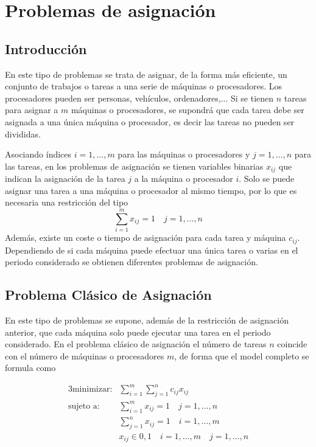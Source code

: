 \section{Problemas de asignación}

\subsection{Introducción}

En este tipo de problemas se trata de asignar, de la forma más eficiente, un conjunto de trabajos o tareas a una serie de 
máquinas o procesadores. Los procesadores pueden ser personas, vehículos, ordenadores,... Si se tienen $n$ tareas para asignar
a $m$ máquinas o procesadores, se supondrá que cada tarea debe ser asignada a una única máquina o procesador, es decir las 
tareas no pueden ser divididas.

\vspace*{2mm}

Asociando índices $i=1,\dots,m$ para las máquinas o procesadores y $j=1,\dots,n$ para las tareas, en los problemas de 
asignación se tienen variables binarias $x_{ij}$ que indican la asignación de la tarea $j$ a la máquina o procesador $i$.
Solo se puede asignar una tarea a una máquina o procesador al mismo tiempo, por lo que es necesaria una restricción del tipo
\[
    \sum_{i=1}^m x_{ij}=1 \quad j=1,\dots,n
\]
Además, existe un coste o tiempo de asignación para cada tarea y máquina $c_{ij}$. Dependiendo de si cada máquina puede
efectuar una única tarea o varias en el periodo considerado se obtienen diferentes problemas de asignación.

\subsection{Problema Clásico de Asignación}

En este tipo de problemas se supone, además de la restricción de asignación anterior, que cada máquina solo puede ejecutar 
una tarea en el periodo considerado. En el problema clásico de asignación el número de tareas $n$ coincide con el número de
máquinas o procesadores $m$, de forma que el model completo se formula como

\begin{alignat}{3}
    \text{minimizar:}   &   \sum_{i=1}^m\sum_{j=1}^n c_{ij}x_{ij}       \\
    \text{sujeto a:}    &   \sum_{i=1}^m x_{ij}=1 \quad j=1,\dots,n     \\
                        &   \sum_{j=1}^n x_{ij}=1 \quad i=1,\dots,m     \\
                        &   x_{ij} \in {0, 1} \quad i=1,\dots,m \quad j=1,\dots,n
\end{alignat}

